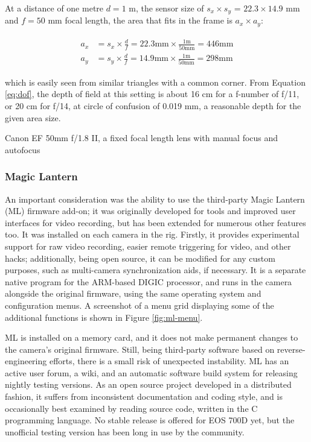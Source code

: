 At a distance of one metre $d = 1$ m, the sensor size of $s_x \times s_y$ = $22.3 \times 14.9$ mm and $f = 50$ mm focal length, the area that fits in the frame is $a_x \times a_y$:

\begin{align} \label{equ:areasize} \begin{split}
	a_x &= s_x \times \frac{d}{f} = 22.3 \text{mm} \times \frac{1 \text{m}}{50 \text{mm}} = 446 \text{mm}\\
	a_y &= s_y \times \frac{d}{f} = 14.9 \text{mm} \times \frac{1 \text{m}}{50 \text{mm}} = 298 \text{mm}
\end{split} \end{align}

which is easily seen from similar triangles with a common corner.
From Equation \ref{eq:dof}, the depth of field at this setting is about 16 cm for a f-number of f/11, or 20 cm for f/14, at circle of confusion of 0.019 mm, a reasonable depth for the given area size.

{Canon EF 50mm f/1.8 II, a fixed focal length lens with manual focus and autofocus}

\subsubsection{Magic Lantern}

An important consideration was the ability to use the third-party Magic Lantern (ML) firmware add-on;
it was originally developed for tools and improved user interfaces for video recording, but has been extended for numerous other features too.
It was installed on each camera in the rig.
Firstly, it provides experimental support for raw video recording, easier remote triggering for video, and other hacks;
additionally, being open source, it can be modified for any custom purposes, such as multi-camera synchronization aids, if necessary.
It is a separate native program for the ARM-based DIGIC processor, and runs in the camera alongside the original firmware, using the same operating system and configuration menus. \cite{magiclantern}
A screenshot of a menu grid displaying some of the additional functions is shown in Figure \ref{fig:ml-menu}.

ML is installed on a memory card, and it does not make permanent changes to the camera's original firmware.
Still, being third-party software based on reverse-engineering efforts, there is a small risk of unexpected instability.
ML has an active user forum, a wiki, and an automatic software build system for releasing nightly testing versions.
As an open source project developed in a distributed fashion, it suffers from inconsistent documentation and coding style, and is occasionally best examined by reading source code, written in the C programming language.
No stable release is offered for EOS 700D yet, but the unofficial testing version has been long in use by the community. \cite{magiclantern}

